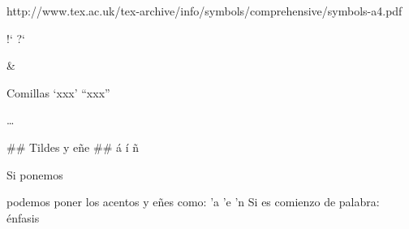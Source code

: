 http://www.tex.ac.uk/tex-archive/info/symbols/comprehensive/symbols-a4.pdf

\textexclamdown %
!` %
\textquestiondown %
?` %

\& %

\geneuro %

Comillas
`xxx' %
``xxx'' %

\ldots %

## Tildes y eñe ##
\'a %
\'i %
\~n %

Si ponemos 
\usepackage[spanish,activeacute]{babel}
podemos poner los acentos y eñes como:
'a
'e
'n
Si es comienzo de palabra: \'enfasis
